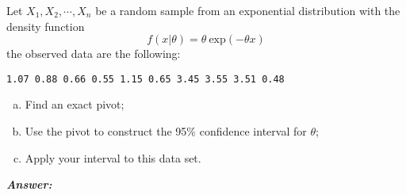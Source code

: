 \documentclass[12pt]{article}
\newenvironment{question}[2][Question]{\begin{trivlist}
\item[\hskip \labelsep {\bfseries #1}\hskip \labelsep {\bfseries #2.}]}{\end{trivlist}}
\begin{document}
\maketitle
 
 \begin{question}{8.1} 
 Let $ X_1, X_2, \cdots, X_n$ be a random sample from an exponential distribution with the density function
 $$
 f(x | \theta) = \theta \  \mathrm{exp}(-\theta x)
 $$
 the observed data are the following: 
      \begin{center}
                        \texttt{1.07   0.88   0.66   0.55   1.15   0.65   3.45   3.55   3.51   0.48} \\
      \end{center}
\begin{enumerate}[(a)]
\item Find an exact pivot;
\item Use the pivot to construct the 95\% confidence interval for $\theta$;
\item Apply your interval to this data set.
\end{enumerate}

\end{question} 

    \textbf{\color{TealBlue}\emph{Answer:} } 
\end{document}
